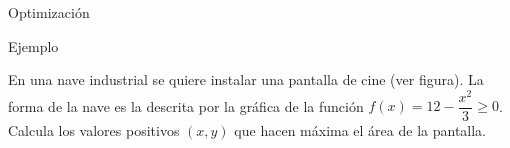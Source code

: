 \documentclass[8pt]{beamer}
\begin{document}
\begin{frame}[t]{Optimización}
\begin{exampleblock}{Ejemplo}


En una nave industrial se quiere instalar una pantalla de cine (ver figura). La forma de la nave es la descrita por la gráfica de la función $f(x) = 12 - \dfrac{x^2}{3} \geq 0$. Calcula los valores positivos $(x,y)$ que hacen máxima el área de la pantalla.\end{exampleblock}
\begin{center}
\end{center}

\end{frame}
\end{document}
